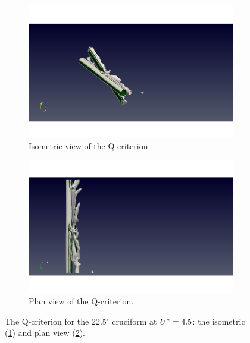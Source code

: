 \documentclass[oneside]{utmthesis}
\begin{document}
\begin{figure}
  \centering
  \begin{subfigure}[h]{0.9\textwidth}
    \includegraphics[width=\textwidth]{figs/qIso225U02}
    \caption{Isometric view of the Q-criterion.}
    \label{fig:qIso225U02}
  \end{subfigure}

  \begin{subfigure}[h]{0.9\textwidth}
    \includegraphics[width=\textwidth]{figs/qTop225U02}
    \caption{Plan view of the Q-criterion.}
    \label{fig:qTop225U02}
  \end{subfigure}

  \caption{The Q-criterion for the 22.5$^{\circ}$ cruciform at $U^{*} = 4.5$: the isometric (\ref{fig:qIso225U02}) and plan view (\ref{fig:qTop225U02}).} \label{fig:qCrit225U02}
\end{figure}
\end{document}
